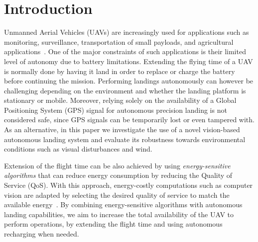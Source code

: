 \documentclass[conference, onecolumn, draftclsnofoot]{IEEEtran}
\begin{document}
\section{Introduction}
\label{sec:introduction}

Unmanned Aerial Vehicles (UAVs) are increasingly used for applications
such as monitoring, surveillance, transportation of small payloads,
and agricultural applications~\cite{costa2012use,salami2014uav}.
%
One of the major constraints of such applications is their limited level of autonomy due to battery limitations. %
%
Extending the flying time of a UAV is normally done by having it land
in order to replace or charge the battery before continuing the
mission. Performing landings autonomously can however be challenging
depending on the environment and whether the landing platform is
stationary or mobile.
%
%
Moreover, relying solely on the availability of a Global Positioning System (GPS) signal for
autonomous precision landing is not considered safe, since GPS signals
can be temporarily lost or even tampered with.
%
%
As an alternative, in this paper we investigate the use of a novel
vision-based autonomous landing system and evaluate its robustness
towards environmental conditions such as visual disturbances and wind.
%


Extension of the flight time can be also achieved by using
\emph{energy-sensitive algorithms} that can reduce energy consumption
by reducing the Quality of Service (QoS). With this approach,
energy-costly computations such as computer vision are adapted by
selecting the desired quality of service to match the available
energy~\cite{seewald2020mechanical}.
%
%
By combining energy-sensitive algorithms with autonomous landing
capabilities, we aim to increase the total availability of the UAV to
perform operations, by extending the flight time and using autonomous
recharging when needed.
%
\end{document}
